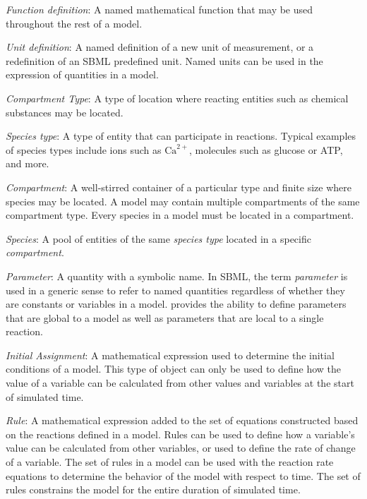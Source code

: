 \begin{description}
  
\item \emph{Function definition}: A named mathematical function
  that may be used throughout the rest of a model.

\item \emph{Unit definition}: A named definition of a new
  unit of measurement, or a redefinition of an SBML predefined
  unit.  Named units can be used in the expression of quantities
  in a model.

\item \emph{Compartment Type}: A type of location where
  reacting entities such as chemical substances may be located.

\item \emph{Species type}: A type of entity
  that can participate in reactions.  Typical examples of species types
  include ions such as $\text{Ca}^{2+}$, molecules such as
  glucose or ATP, and more.

\item \emph{Compartment}: A well-stirred container of a
  particular type and finite size where species may be located.
  A model may contain multiple compartments of the same
  compartment type.  Every species in a model must be located in
  a compartment.

\item \emph{Species}: A pool of entities of the same
  \emph{species type} located in a specific \emph{compartment}.

\item \emph{Parameter}: A quantity with a symbolic name.
  In SBML, the term \emph{parameter} is used in a generic sense
  to refer to named quantities regardless of whether they are
  constants or variables in a model.  \sbmltwo provides the
  ability to define parameters that are global to a model as
  well as parameters that are local to a single reaction.
  
\item \emph{Initial Assignment}: A mathematical
  expression used to determine the initial conditions of a
  model.  This type of object can only be used to define how
  the value of a variable can be calculated from other values
  and variables at the start of simulated time.
  
\item \emph{Rule}: A mathematical expression added to the set of
  equations constructed based on the reactions defined in a model.
  Rules can be used to define how a variable's value can
  be calculated from other variables, or used to define the rate
  of change of a variable.  The set of rules in a model can be
  used with the reaction rate equations to determine the
  behavior of the model with respect to time.  The set of rules
  constrains the model for the entire duration of simulated
  time.


\end{description}
